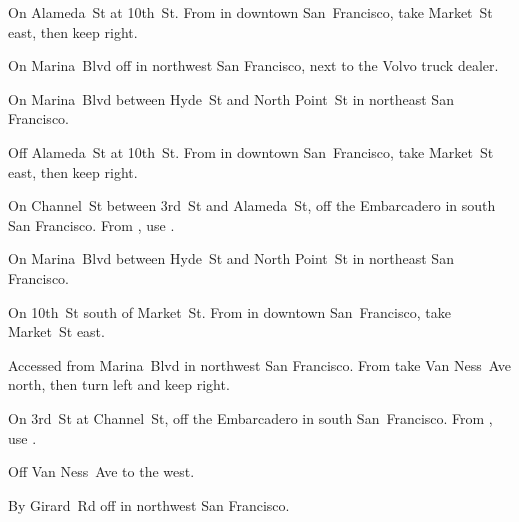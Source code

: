 
\begin{LocationList}

On Alameda~St at 10th~St.
From  in downtown San~Francisco, take Market~St east, then keep right.

On Marina~Blvd off  in northwest San Francisco, next to the Volvo truck dealer.

On Marina~Blvd between Hyde~St and North Point~St in northeast San Francisco.

Off Alameda~St at 10th~St.
From  in downtown San~Francisco, take Market~St east, then keep right.

\Location{\GasStation \Gas \Rest \Service}
On Channel~St between 3rd~St and Alameda~St, off the Embarcadero in south San Francisco.
From , use  .

On Marina~Blvd between Hyde~St and North Point~St in northeast San Francisco.

On 10th~St south of Market~St.
From  in downtown San~Francisco, take Market~St east.

Accessed from Marina~Blvd in northwest San Francisco.
From  take Van Ness~Ave north, then turn left and keep right.

On 3rd~St at Channel~St, off the Embarcadero in south San~Francisco.
From , use  .

Off  Van Ness~Ave to the west.

By Girard~Rd off   in northwest San Francisco.

\end{LocationList}
